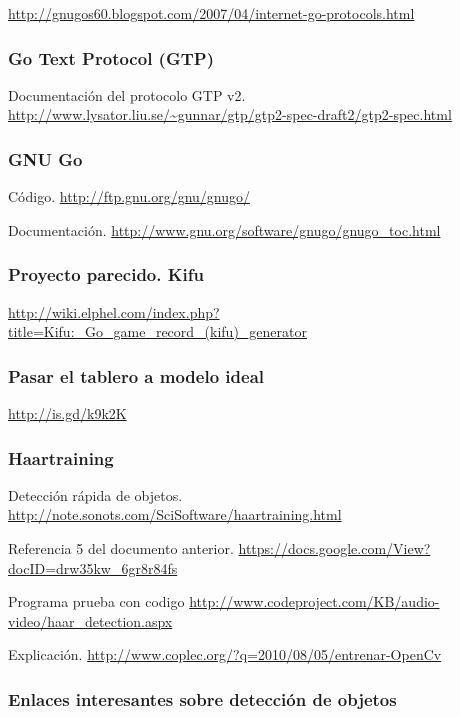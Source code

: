 \documentclass[12pt,a4papert,woside,openright,titlepage,final]{book}
\begin{document}
\url{http://gnugos60.blogspot.com/2007/04/internet-go-protocols.html}

\subsubsection{Go Text Protocol (GTP)}

Documentación del protocolo GTP v2.
\url{http://www.lysator.liu.se/~gunnar/gtp/gtp2-spec-draft2/gtp2-spec.html}

\subsubsection{GNU Go}

Código.
\url{http://ftp.gnu.org/gnu/gnugo/}

Documentación.
\url{http://www.gnu.org/software/gnugo/gnugo_toc.html}

\subsubsection{Proyecto parecido. Kifu}

\url{http://wiki.elphel.com/index.php?title=Kifu:_Go_game_record_(kifu)_generator}

\subsubsection{Pasar el tablero a modelo ideal}

\url{http://is.gd/k9k2K}

\subsubsection{Haartraining}

Detección rápida de objetos.
\url{http://note.sonots.com/SciSoftware/haartraining.html}

Referencia 5 del documento anterior.
\url{https://docs.google.com/View?docID=drw35kw_6gr8r84fs}

Programa prueba con codigo
\url{http://www.codeproject.com/KB/audio-video/haar_detection.aspx}

Explicación.
\url{http://www.coplec.org/?q=2010/08/05/entrenar-OpenCv}

\subsubsection{Enlaces interesantes sobre detección de objetos}
\end{document}
